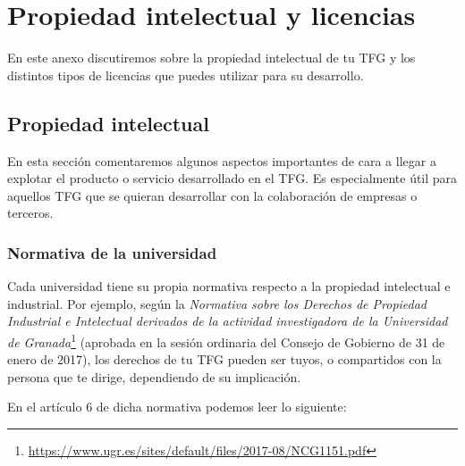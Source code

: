 \appendix
\chapter{Propiedad intelectual y licencias}\label{anexo:licencias}

En este anexo discutiremos sobre la propiedad intelectual de tu TFG y los distintos tipos de licencias que puedes utilizar para su desarrollo.

\section{Propiedad intelectual}
\label{sec:propiedadinte}
En esta sección comentaremos algunos aspectos importantes de cara a llegar a explotar el producto o servicio desarrollado en el TFG. Es especialmente útil para aquellos TFG que se quieran desarrollar con la colaboración de empresas o terceros.

\subsection{Normativa de la universidad}

Cada universidad tiene su propia normativa respecto a la propiedad intelectual e industrial. Por ejemplo, según la \textit{Normativa sobre los Derechos de Propiedad Industrial e Intelectual derivados de la actividad investigadora de la Universidad de Granada}\footnote{\url{https://www.ugr.es/sites/default/files/2017-08/NCG1151.pdf}} (aprobada en la sesión ordinaria del Consejo de Gobierno de 31 de enero de 2017), los derechos de tu TFG pueden ser tuyos, o compartidos con la persona que te dirige, dependiendo de su implicación.

En el artículo 6 de dicha normativa podemos leer lo siguiente:

